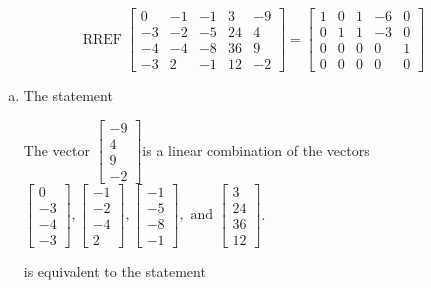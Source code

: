 \begin{exerciseAnswer} 
\[\operatorname{RREF}  \left[\begin{array}{cccc|c}
0 & -1 & -1 & 3 & -9 \\
-3 & -2 & -5 & 24 & 4 \\
-4 & -4 & -8 & 36 & 9 \\
-3 & 2 & -1 & 12 & -2
\end{array}\right] = \left[\begin{array}{cccc|c}
1 & 0 & 1 & -6 & 0 \\
0 & 1 & 1 & -3 & 0 \\
0 & 0 & 0 & 0 & 1 \\
0 & 0 & 0 & 0 & 0
\end{array}\right] \]
\begin{enumerate}[(a)]
\item  The statement 
\begin{center}\begin{minipage}{0.8\textwidth}
 The vector \( \left[\begin{array}{c}
-9 \\
4 \\
9 \\
-2
\end{array}\right] \)is a linear combination of the vectors \( \left[\begin{array}{c}
0 \\
-3 \\
-4 \\
-3
\end{array}\right] , \left[\begin{array}{c}
-1 \\
-2 \\
-4 \\
2
\end{array}\right] , \left[\begin{array}{c}
-1 \\
-5 \\
-8 \\
-1
\end{array}\right] , \text{ and } \left[\begin{array}{c}
3 \\
24 \\
36 \\
12
\end{array}\right] \). 
\end{minipage}\end{center}
     is equivalent to the statement 
\begin{center}\begin{minipage}{0.8\textwidth}

\end{minipage}
\end{center}
\end{enumerate}
\end{exerciseAnswer}
